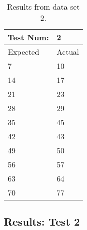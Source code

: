 \begin{table}[]
\centering
\begin{tabular}{ll}
Test Num:                     & 2      \\ \hline
\multicolumn{1}{l|}{Expected} & Actual \\ \hline
\multicolumn{1}{l|}{7}        & 10     \\
\multicolumn{1}{l|}{14}       & 17     \\
\multicolumn{1}{l|}{21}       & 23     \\
\multicolumn{1}{l|}{28}       & 29     \\
\multicolumn{1}{l|}{35}       & 45     \\
\multicolumn{1}{l|}{42}       & 43     \\
\multicolumn{1}{l|}{49}       & 50     \\
\multicolumn{1}{l|}{56}       & 57     \\
\multicolumn{1}{l|}{63}       & 64     \\
\multicolumn{1}{l|}{70}       & 77    
\end{tabular}
\caption{Results from data set 2.}
\label{AngleTest1Result}
\end{table}

\subsection{Results: Test 2}



